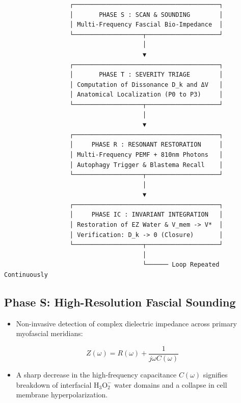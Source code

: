 \documentclass[10pt,twocolumn]{article}
\begin{document}
\begin{verbatim}
                  ┌────────────────────────────────────────┐
                  │       PHASE S : SCAN & SOUNDING        │
                  │ Multi-Frequency Fascial Bio-Impedance  │
                  └───────────────────┬────────────────────┘
                                      │
                                      ▼
                  ┌────────────────────────────────────────┐
                  │       PHASE T : SEVERITY TRIAGE        │
                  │ Computation of Dissonance D_k and ΔV   │
                  │ Anatomical Localization (P0 to P3)     │
                  └───────────────────┬────────────────────┘
                                      │
                                      ▼
                  ┌────────────────────────────────────────┐
                  │     PHASE R : RESONANT RESTORATION     │
                  │ Multi-Frequency PEMF + 810nm Photons   │
                  │ Autophagy Trigger & Blastema Recall    │
                  └───────────────────┬────────────────────┘
                                      │
                                      ▼
                  ┌────────────────────────────────────────┐
                  │     PHASE IC : INVARIANT INTEGRATION   │
                  │ Restoration of EZ Water & V_mem -> V*  │
                  │ Verification: D_k -> 0 (Closure)       │
                  └───────────────────┬────────────────────┘
                                      │
                                      └────── Loop Repeated Continuously
\end{verbatim}


\subsection{Phase S: High-Resolution Fascial Sounding}
\begin{itemize}
  \item Non-invasive detection of complex dielectric impedance across primary myofascial meridians:
\end{itemize}
\begin{equation}
  Z(\omega) = R(\omega) + \frac{1}{j\omega C(\omega)}
\end{equation}
\begin{itemize}
  \item A sharp decrease in the high-frequency capacitance $C(\omega)$ signifies breakdown of interfacial $\text{H}_3\text{O}_2^-$ water domains and a collapse in cell membrane hyperpolarization.
\end{itemize}
\end{document}
